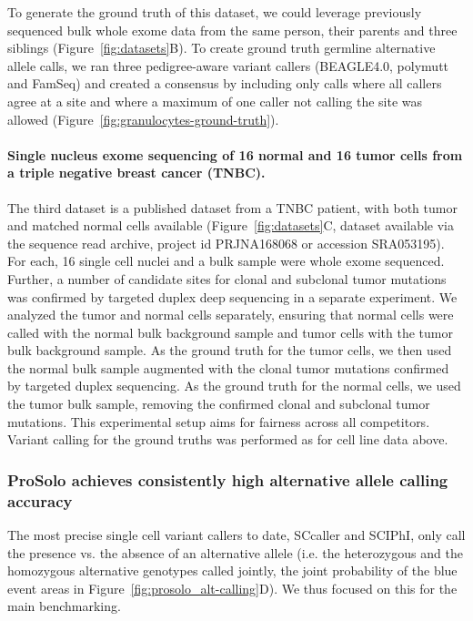\documentclass[12pt,inline]{wlscirep}
\begin{document}
To generate the ground truth of this dataset, we could leverage previously sequenced bulk whole exome data from the same person, their parents and three siblings \cite{hoell_constitutional_2014} (Figure~\ref{fig:datasets}B).
To create ground truth germline alternative allele calls, we ran three pedigree-aware variant callers (BEAGLE4.0\cite{browning_improving_2013}, polymutt\cite{li_likelihood-based_2012} and FamSeq\cite{peng_rare_2013,peng_famseq:_2014}) and created a consensus by including only calls where all callers agree at a site and where a maximum of one caller not calling the site was allowed (Figure~\ref{fig:granulocytes-ground-truth}).

\paragraph{Single nucleus exome sequencing of 16 normal and 16 tumor cells from a triple negative breast cancer (TNBC)\cite{wang_clonal_2014}.}
The third dataset is a published dataset from a TNBC patient, with both tumor and matched normal cells available (Figure~\ref{fig:datasets}C, dataset available via the sequence read archive, project id \mbox{PRJNA168068} or accession \mbox{SRA053195}).
For each, 16 single cell nuclei and a bulk sample were whole exome sequenced.
Further, a number of candidate sites for clonal and subclonal tumor mutations was confirmed by targeted duplex deep sequencing in a separate experiment\cite{wang_clonal_2014}.
We analyzed the tumor and normal cells separately, ensuring that normal cells were called with the normal bulk background sample and tumor cells with the tumor bulk background sample.
As the ground truth for the tumor cells, we then used the normal bulk sample augmented with the clonal tumor mutations confirmed by targeted duplex sequencing.
As the ground truth for the normal cells, we used the tumor bulk sample, removing the confirmed clonal and subclonal tumor mutations.
This experimental setup aims for fairness across all competitors. 
Variant calling for the ground truths was performed as for cell line data above.

\subsubsection{ProSolo achieves consistently high alternative allele calling accuracy}

The most precise single cell variant callers to date, SCcaller and SCIPhI, only call the presence vs. the absence of an alternative allele (i.e. the heterozygous and the homozygous alternative genotypes called jointly, the joint probability of the blue event areas in Figure~\ref{fig:prosolo_alt-calling}D).
We thus focused on this for the main benchmarking.
\end{document}
